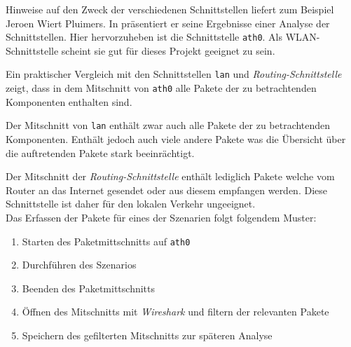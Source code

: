 Hinweise auf den Zweck der verschiedenen Schnittstellen liefert zum Beispiel Jeroen Wiert Pluimers.
In \cite{fritzcap8:online} präsentiert er seine Ergebnisse einer Analyse der Schnittstellen.
Hier hervorzuheben ist die Schnittstelle \texttt{ath0}.
Als WLAN-Schnittstelle scheint sie gut für dieses Projekt geeignet zu sein.

Ein praktischer Vergleich mit den Schnittstellen \texttt{lan} und \textit{Routing-Schnittstelle} zeigt,
dass in dem Mitschnitt von \texttt{ath0} alle Pakete der zu betrachtenden Komponenten enthalten sind.

Der Mitschnitt von \texttt{lan} enthält zwar auch alle Pakete der zu betrachtenden Komponenten.
Enthält jedoch auch viele andere Pakete was die Übersicht über die auftretenden Pakete stark beeinrächtigt.

Der Mitschnitt der \textit{Routing-Schnittstelle} enthält lediglich Pakete welche vom Router an das Internet gesendet
oder aus diesem empfangen werden.
Diese Schnittstelle ist daher für den lokalen Verkehr ungeeignet.\\

Das Erfassen der Pakete für eines der Szenarien folgt folgendem Muster:
\begin{enumerate}
    \setlength\itemsep{-0.5em}
    \item Starten des Paketmittschnitts auf \texttt{ath0}
    \item Durchführen des Szenarios
    \item Beenden des Paketmittschnitts
    \item Öffnen des Mitschnitts mit \textit{Wireshark} und filtern der relevanten Pakete
    \item Speichern des gefilterten Mitschnitts zur späteren Analyse
\end{enumerate}